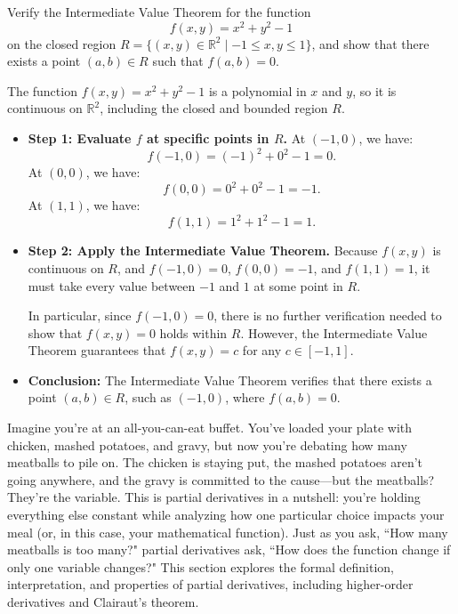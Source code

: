 \exampleline
\begin{example}
Verify the Intermediate Value Theorem for the function 
\[
f(x, y) = x^2 + y^2 - 1
\]
on the closed region \( R = \{(x, y) \in \mathbb{R}^2 \mid -1 \leq x, y \leq 1\} \), and show that there exists a point \( (a, b) \in R \) such that \( f(a, b) = 0 \).

\begin{solution}
The function \( f(x, y) = x^2 + y^2 - 1 \) is a polynomial in \( x \) and \( y \), so it is continuous on \( \mathbb{R}^2 \), including the closed and bounded region \( R \). 

\begin{itemize}
    \item \textbf{Step 1: Evaluate \( f \) at specific points in \( R \).}
    At \( (-1, 0) \), we have:
    \[
    f(-1, 0) = (-1)^2 + 0^2 - 1 = 0.
    \]
    At \( (0, 0) \), we have:
    \[
    f(0, 0) = 0^2 + 0^2 - 1 = -1.
    \]
    At \( (1, 1) \), we have:
    \[
    f(1, 1) = 1^2 + 1^2 - 1 = 1.
    \]

    \item \textbf{Step 2: Apply the Intermediate Value Theorem.}
    Because \( f(x, y) \) is continuous on \( R \), and \( f(-1, 0) = 0 \), \( f(0, 0) = -1 \), and \( f(1, 1) = 1 \), it must take every value between \( -1 \) and \( 1 \) at some point in \( R \). 

    In particular, since \( f(-1, 0) = 0 \), there is no further verification needed to show that \( f(x, y) = 0 \) holds within \( R \). However, the Intermediate Value Theorem guarantees that \( f(x, y) = c \) for any \( c \in [-1, 1] \).

    \item \textbf{Conclusion:} The Intermediate Value Theorem verifies that there exists a point \( (a, b) \in R \), such as \( (-1, 0) \), where \( f(a, b) = 0 \).
\end{itemize}
\end{solution}
\end{example}
\exampleline


\newpage











 

\noindent Imagine you’re at an all-you-can-eat buffet. You’ve loaded your plate with chicken, mashed potatoes, and gravy, but now you’re debating how many meatballs to pile on. The chicken is staying put, the mashed potatoes aren’t going anywhere, and the gravy is committed to the cause—but the meatballs? They’re the variable. This is partial derivatives in a nutshell: you’re holding everything else constant while analyzing how one particular choice impacts your meal (or, in this case, your mathematical function). Just as you ask, ``How many meatballs is too many?" partial derivatives ask, ``How does the function change if only one variable changes?" This section explores the formal definition, interpretation, and properties of partial derivatives, including higher-order derivatives and Clairaut's theorem.

